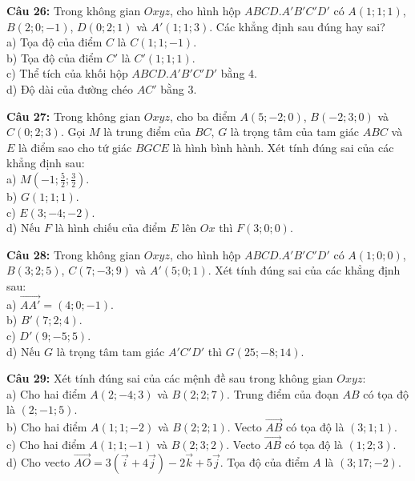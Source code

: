 \documentclass[12pt]{article}
\begin{document}
	\vspace{4mm}
	\noindent \textbf{Câu 26:} Trong không gian $Oxyz$, cho hình hộp $ABCD.A'B'C'D'$ có $A(1; 1; 1)$, $B(2; 0; -1)$, $D(0; 2; 1)$ và $A'(1; 1; 3)$. Các khẳng định sau đúng hay sai? \\
	\noindent a) Tọa độ của điểm $C$ là $C(1; 1; -1)$. \\
	\noindent b) Tọa độ của điểm $C'$ là $C'(1; 1; 1)$. \\
	\noindent c) Thể tích của khối hộp $ABCD.A'B'C'D'$ bằng $4$. \\
	\noindent d) Độ dài của đường chéo $AC'$ bằng $3$.
	
	\noindent \textbf{Câu 27:} Trong không gian $Oxyz$, cho ba điểm $A(5; -2; 0)$, $B(-2; 3; 0)$ và $C(0; 2; 3)$. Gọi $M$ là trung điểm của $BC$, $G$ là trọng tâm của tam giác $ABC$ và $E$ là điểm sao cho tứ giác $BGCE$ là hình bình hành. Xét tính đúng sai của các khẳng định sau: \\
	\noindent a) $M\left(-1; \frac{5}{2}; \frac{3}{2}\right)$. \\
	\noindent b) $G(1; 1; 1)$. \\
	\noindent c) $E(3; -4; -2)$. \\
	\noindent d) Nếu $F$ là hình chiếu của điểm $E$ lên $Ox$ thì $F(3; 0; 0)$.
	
	\vspace{4mm}
	\noindent \textbf{Câu 28:} Trong không gian $Oxyz$, cho hình hộp $ABCD.A'B'C'D'$ có $A(1; 0; 0)$, $B(3; 2; 5)$, $C(7; -3; 9)$ và $A'(5; 0; 1)$. Xét tính đúng sai của các khẳng định sau: \\
	\noindent a) $\vec{AA'} = (4; 0; -1)$. \\
	\noindent b) $B'(7; 2; 4)$. \\
	\noindent c) $D'(9; -5; 5)$. \\
	\noindent d) Nếu $G$ là trọng tâm tam giác $A'C'D'$ thì $G(25; -8; 14)$.
	
	\vspace{4mm}
	\noindent \textbf{Câu 29:} Xét tính đúng sai của các mệnh đề sau trong không gian $Oxyz$: \\
	\noindent a) Cho hai điểm $A(2; -4; 3)$ và $B(2; 2; 7)$. Trung điểm của đoạn $AB$ có tọa độ là $(2; -1; 5)$. \\
	\noindent b) Cho hai điểm $A(1; 1; -2)$ và $B(2; 2; 1)$. Vecto $\vec{AB}$ có tọa độ là $(3; 1; 1)$. \\
	\noindent c) Cho hai điểm $A(1; 1; -1)$ và $B(2; 3; 2)$. Vecto $\vec{AB}$ có tọa độ là $(1; 2; 3)$. \\
	\noindent d) Cho vecto $\vec{AO} = 3(\vec{i} + 4\vec{j}) - 2\vec{k} + 5\vec{j}$. Tọa độ của điểm $A$ là $(3; 17; -2)$.
	
\end{document}
